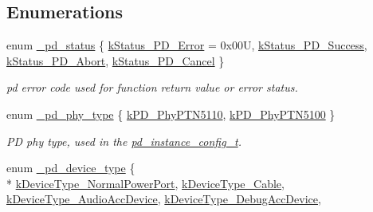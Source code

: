 \subsection*{Enumerations}
\begin{DoxyCompactItemize}
\item 
enum \hyperlink{group__usb__pd__stack_gaaad4cd00dd02567c6169429e3a895073}{\-\_\-pd\-\_\-status} \{ \hyperlink{group__usb__pd__stack_ggaaad4cd00dd02567c6169429e3a895073a4d58370b8ee8d3d2a4c477f7a3f84dda}{k\-Status\-\_\-\-P\-D\-\_\-\-Error} = 0x00\-U, 
\hyperlink{group__usb__pd__stack_ggaaad4cd00dd02567c6169429e3a895073acf06f954f9c52f560cea34df48c63555}{k\-Status\-\_\-\-P\-D\-\_\-\-Success}, 
\hyperlink{group__usb__pd__stack_ggaaad4cd00dd02567c6169429e3a895073a4891ab8e97ec291cd5314365d341fe90}{k\-Status\-\_\-\-P\-D\-\_\-\-Abort}, 
\hyperlink{group__usb__pd__stack_ggaaad4cd00dd02567c6169429e3a895073a6c0b47780246a36a36196cd5ff8abb52}{k\-Status\-\_\-\-P\-D\-\_\-\-Cancel}
 \}
\begin{DoxyCompactList}\small\item\em pd error code used for function return value or error status. \end{DoxyCompactList}\item 
enum \hyperlink{group__usb__pd__stack_ga8bd01601105e164bc0e0bb538aaa5c1c}{\-\_\-pd\-\_\-phy\-\_\-type} \{ \hyperlink{group__usb__pd__stack_gga8bd01601105e164bc0e0bb538aaa5c1ca6f0eabe71ca45162254c941b34558d2c}{k\-P\-D\-\_\-\-Phy\-P\-T\-N5110}, 
\hyperlink{group__usb__pd__stack_gga8bd01601105e164bc0e0bb538aaa5c1ca822af45ba751bc878c6931b765585412}{k\-P\-D\-\_\-\-Phy\-P\-T\-N5100}
 \}
\begin{DoxyCompactList}\small\item\em P\-D phy type, used in the \hyperlink{group__usb__pd__stack_gafa6034f9e204836697da1f2fc996cbad}{pd\-\_\-instance\-\_\-config\-\_\-t}. \end{DoxyCompactList}\item 
enum \hyperlink{group__usb__pd__stack_ga922338772b41ceba51f7881c74b9e20a}{\-\_\-pd\-\_\-device\-\_\-type} \{ \\*
\hyperlink{group__usb__pd__stack_gga922338772b41ceba51f7881c74b9e20aaf6c770c6cd3614cd0cd48acee1124063}{k\-Device\-Type\-\_\-\-Normal\-Power\-Port}, 
\hyperlink{group__usb__pd__stack_gga922338772b41ceba51f7881c74b9e20aad424c8854f1c1bda150086d0aec89097}{k\-Device\-Type\-\_\-\-Cable}, 
\hyperlink{group__usb__pd__stack_gga922338772b41ceba51f7881c74b9e20aa6de884777d9b8d2d9adc352cf69a47a5}{k\-Device\-Type\-\_\-\-Audio\-Acc\-Device}, 
\hyperlink{group__usb__pd__stack_gga922338772b41ceba51f7881c74b9e20aa8c9292abbbff81ac826f46952cb60123}{k\-Device\-Type\-\_\-\-Debug\-Acc\-Device}, 

\end{DoxyCompactItemize}
